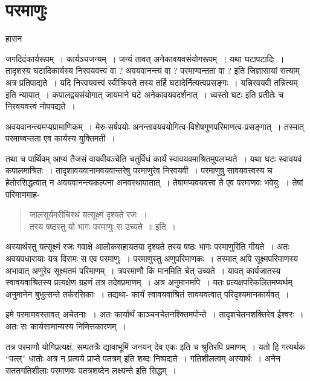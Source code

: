 {\fontsize{15}{17}\selectfont
\presetvalues
\chapter{परमाणुः}

\begin{center}
\smallskip
हासन
\addrule
\end{center}
जगदिदंकार्यरूपम्~। कार्यञ्चजन्यम्~। जन्यं तावत् अनेकावयवसंयोगरूपम्~। यथा घटापटादिः~। तादृशस्य घटादिकार्यस्य निरवयवत्त्वं वा ? अवयवानन्त्यं वा ? परमाण्वन्तता वा ? इति जिज्ञासायां सत्याम् अत्र प्रतिपाद्यते~। यदि निरवयवत्त्वं स्वीक्रियते तस्य तर्हि घटादेर्नित्यत्वप्रसङ्गः~। यन्निरवयवी तन्नित्यम् इति न्यायात्~। कपालद्वयसंयोगात् जायमाने घटे अनेकावयवदर्शनात्~। ध्वस्तो घटः इति प्रतीतेः च निरवयवत्त्वं नोपपद्यते~। 

अवयवानन्त्यमप्यप्रामाणिकम्~। मेरु-सर्षपयोः अनन्तावयवयोगित्व-विशेषगुणपरिमाण\-त्व-प्रसङ्गात्~। तस्मात् परमाण्वन्तता एव कार्यस्य युक्तिमती~। 

तथा च पार्थिवम् आप्यं तैजसं वायवीयञ्चेति चतुर्विधं कार्यं स्वावयवमाश्रितमुपलभ्यते~। यथा घटः स्वावयवं कपालमाश्रितः~। तादृशावयवानामवयवान्तरेषु परमाणुरेव निरवयवी~। परमाणुषु सावयवत्त्वस्य च हेतोरसिद्धत्वात् न अवयवानन्त्यकल्पना अनवस्थापातात्~। तेषामप्यवयवत्त्व ते एव परमाणवः भवेयुः~। तेषां परिमाणमाह-
\begin{verse}
जालसूर्यमरीचिस्थं यत्सूक्ष्मं दृश्यते रजः~। \\
तस्य षष्ठस्तु यो भागः परमाणुः स उच्यते~॥ इति~। 
\end{verse}
अस्यार्थस्तु यत्सूक्ष्मं रजः गवाक्षे आलोकसहायतया दृश्यते तस्य षष्ठः भागः परमाणुरिति गीयते~। अतः अवयवधारायाः यत्र विरामः स एव परमाणुः~। परमाणुस्तु अणुपरिमाणकः~। तस्मात् अपि सूक्ष्मपरिमाणस्य अभावात् अणुरेव सूक्ष्मतमं परिमाणम्~। त्रपरमाणौ किं मानमिति चेत् उच्यते~। यावत् कार्यजातस्य स्वावयवाश्रितस्य प्रत्यक्षेण ग्रहणं तत्र तदेवप्रमाणम्~। अत्र अनुमानमपि~। यतः प्रत्यक्षपरिकलितमप्यर्थम् अनुमानेन बुभुत्सन्ते तर्करसिकाः~। तद्यथा- कार्यं स्वावयवाश्रितं सावयवत्वात् परिदृश्यमानकार्यवत्~। 

इमे परमाणवस्तावत् अचेतनाः~। अतः कार्यार्थं काञ्चनचेतनश्क्तिमपोन्ते~। तादृशचेतनशक्तिरेव ईश्वरः~। अतः सः कार्यसामान्यस्य निमित्तकारणम्~। 

तत्र परमाणौ योगिप्रत्यक्षं, सम्पतत्रैः द्यावाभूमिं जनयन् देव एकः इति च श्रुतिरपि प्रमाणम्~। यतो हि गत्यर्थक “पत्ल्” धातोः अत्र न प्रत्यये प्राप्ते पतत्रम् इति शब्दः निष्पद्यते~। गतिशीलत्वम् अस्यार्थः~। अनेन सततगतिशीलाः परमाणवः पतत्रशब्देन लक्ष्यन्ते इति सिद्धम्~। 

}

